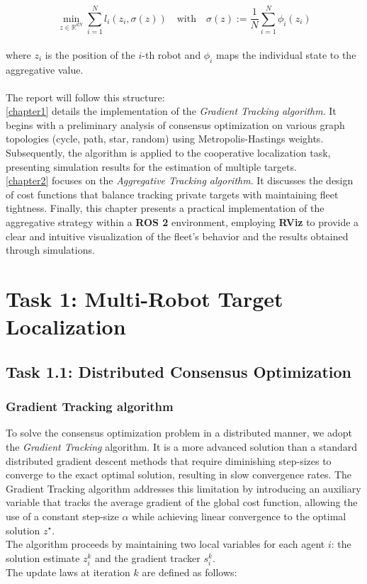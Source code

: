 \documentclass[a4paper,11pt,oneside]{book}
\begin{document}
\[
    \min_{z \in \mathbb{R}^{dN}} \sum_{i=1}^{N} l_{i}(z_i, \sigma(z)) \quad \text{with} \quad \sigma(z) := \frac{1}{N}\sum_{i=1}^{N} \phi_i(z_i)
    \]
\\
where $z_i$ is the position of the $i$-th robot and $\phi_i$ maps the individual state to the aggregative value.
\\\\
The report will follow this structure:\\
\autoref{chapter1} details the implementation of the \textit{Gradient Tracking algorithm}. It begins with a preliminary analysis of consensus optimization on various graph topologies (cycle, path, star, random) using Metropolis-Hastings weights. Subsequently, the algorithm is applied to the cooperative localization task, presenting simulation results for the estimation of multiple targets. \\
\autoref{chapter2} focuses on the \textit{Aggregative Tracking algorithm}. It discusses the design of cost functions that balance tracking private targets with maintaining fleet tightness. Finally, this chapter presents a practical implementation of the aggregative strategy within a \textbf{ROS 2} environment, employing \textbf{RViz} to provide a clear and intuitive visualization of the fleet's behavior and the results obtained through simulations.

\chapter{Task 1: Multi-Robot Target Localization}
\label{chapter1}



\section{Task 1.1: Distributed Consensus Optimization}
\label{chapter1.1}
\subsection{Gradient Tracking algorithm}

To solve the consensus optimization problem in a distributed manner, we adopt the \textit{Gradient Tracking} algorithm. It is a more advanced solution than a standard distributed gradient descent methods that require diminishing step-sizes to converge to the exact optimal solution, resulting in slow convergence rates. The Gradient Tracking algorithm addresses this limitation by introducing an auxiliary variable that tracks the average gradient of the global cost function, allowing the use of a constant step-size $\alpha$ while achieving linear convergence to the optimal solution $z^\star$. 
\\
The algorithm proceeds by maintaining two local variables for each agent $i$: the solution estimate $z_i^k$ and the gradient tracker $s_i^k$. \\
The update laws at iteration $k$ are defined as follows:
\end{document}
